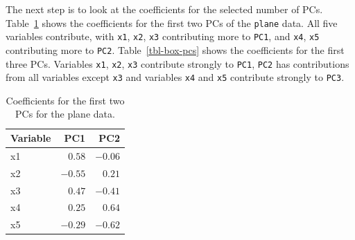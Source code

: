 \documentclass[
  letterpaper,
]{book}
\newenvironment{Shaded}{\begin{snugshade}}{\end{snugshade}}
\newcommand{\AttributeTok}[1]{\textcolor[rgb]{0.40,0.45,0.13}{#1}}
\newcommand{\DecValTok}[1]{\textcolor[rgb]{0.68,0.00,0.00}{#1}}
\newcommand{\FunctionTok}[1]{\textcolor[rgb]{0.28,0.35,0.67}{#1}}
\newcommand{\NormalTok}[1]{\textcolor[rgb]{0.00,0.23,0.31}{#1}}
\newcommand{\SpecialCharTok}[1]{\textcolor[rgb]{0.37,0.37,0.37}{#1}}
\newcommand{\StringTok}[1]{\textcolor[rgb]{0.13,0.47,0.30}{#1}}
\begin{document}
The next step is to look at the coefficients for the selected number of
PCs. Table~\ref{tbl-plane-pcs} shows the coefficients for the first two
PCs of the \texttt{plane} data. All five variables contribute, with
\texttt{x1}, \texttt{x2}, \texttt{x3} contributing more to \texttt{PC1},
and \texttt{x4}, \texttt{x5} contributing more to \texttt{PC2}.
Table~\ref{tbl-box-pcs} shows the coefficients for the first three PCs.
Variables \texttt{x1}, \texttt{x2}, \texttt{x3} contribute strongly to
\texttt{PC1}, \texttt{PC2} has contributions from all variables except
\texttt{x3} and variables \texttt{x4} and \texttt{x5} contribute
strongly to \texttt{PC3}.

\begin{Shaded}
\end{Shaded}

\hypertarget{tbl-plane-pcs}{}
\begin{longtable}{lrr}
\caption{\label{tbl-plane-pcs}Coefficients for the first two PCs for the plane data. }\tabularnewline

\toprule
Variable & PC1 & PC2 \\ 
\midrule
x1 & $0.58$ & $-0.06$ \\ 
x2 & $-0.55$ & $0.21$ \\ 
x3 & $0.47$ & $-0.41$ \\ 
x4 & $0.25$ & $0.64$ \\ 
x5 & $-0.29$ & $-0.62$ \\ 
\bottomrule
\end{longtable}

\begin{Shaded}
\end{Shaded}
\end{document}
